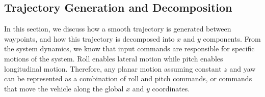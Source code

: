 \documentclass[letterpaper, 10 pt, conference]{ieeeconf}  %
\newcommand\NB[1]{$\spadesuit$\footnote{NB: #1}}
\begin{document}
%


\subsection{Trajectory Generation and Decomposition} \label{sec:traj}

In this section, we discuss how a smooth trajectory is generated between waypoints, and how this trajectory is decomposed into $x$ and $y$ components. From the system dynamics, we know that input commands are responsible for specific motions of the system. Roll enables lateral motion while pitch enables longitudinal motion. Therefore, any planar motion assuming constant $z$ and yaw can be represented as a combination of roll and pitch commands, or commands that move the vehicle along the global $x$ and $y$ coordinates. 

\end{document}
